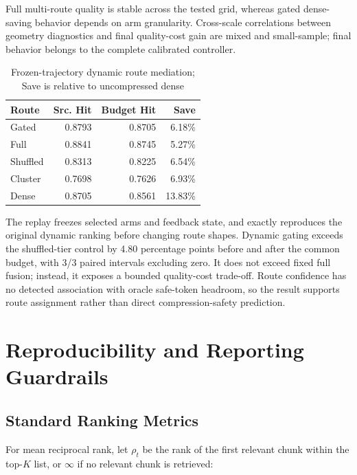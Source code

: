 Full multi-route quality is stable across the tested grid, whereas gated dense-saving behavior depends on arm granularity. Cross-scale correlations between geometry diagnostics and final quality-cost gain are mixed and small-sample; final behavior belongs to the complete calibrated controller.

\begin{table}[pos=tbp]
\centering
\small
\caption{Frozen-trajectory dynamic route mediation; Save is relative to uncompressed dense}
\label{tab:s21}
\begin{tabular}{lrrr}
\toprule
Route & Src. Hit & Budget Hit & Save \\
\midrule
Gated & 0.8793 & 0.8705 & 6.18\% \\
Full & 0.8841 & 0.8745 & 5.27\% \\
Shuffled & 0.8313 & 0.8225 & 6.54\% \\
Cluster & 0.7698 & 0.7626 & 6.93\% \\
Dense & 0.8705 & 0.8561 & 13.83\% \\
\bottomrule
\end{tabular}
\end{table}

The replay freezes selected arms and feedback state, and exactly reproduces the original dynamic ranking before changing route shapes. Dynamic gating exceeds the shuffled-tier control by 4.80 percentage points before and after the common budget, with 3/3 paired intervals excluding zero. It does not exceed fixed full fusion; instead, it exposes a bounded quality-cost trade-off. Route confidence has no detected association with oracle safe-token headroom, so the result supports route assignment rather than direct compression-safety prediction.

\section{Reproducibility and Reporting Guardrails}
\label{sec:12-appendix:reproducibility-and-reporting-guardrails}

\subsection{Standard Ranking Metrics}
\label{sec:12-appendix:standard-ranking-metrics}

For mean reciprocal rank, let $\rho_t$ be the rank of the first relevant chunk within the top-$K$ list, or $\infty$ if no relevant chunk is retrieved:

